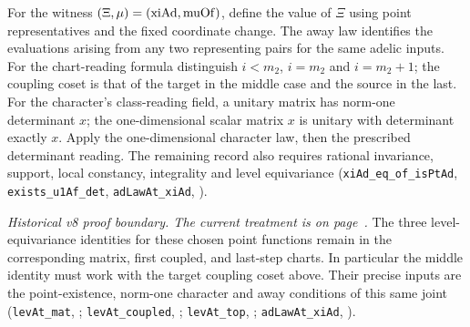 For the witness \((\Xi,\mu)=({\rm xiAd},{\rm muOf})\), define the value of \(\Xi\) using point representatives and the fixed coordinate change. The away law identifies the evaluations arising from any two representing pairs for the same adelic inputs. For the chart-reading formula distinguish \(i<m_2\), \(i=m_2\) and \(i=m_2+1\); the coupling coset is that of the target in the middle case and the source in the last. For the character's class-reading field, a unitary matrix has norm-one determinant \(x\); the one-dimensional scalar matrix \(x\) is unitary with determinant exactly \(x\). Apply the one-dimensional character law, then the prescribed determinant reading. The remaining record also requires rational invariance, support, local constancy, integrality and level equivariance (\nolinkurl{xiAd_eq_of_isPtAd}, \nolinkurl{exists_u1Af_det}, \nolinkurl{adLawAt_xiAd}, ).

\emph{Historical v8 proof boundary. The current treatment is on page~\pageref{r8:Z4.2.02}.} The three level-equivariance identities for these chosen point functions remain in the corresponding matrix, first coupled, and last-step charts. In particular the middle identity must work with the target coupling coset above. Their precise inputs are the point-existence, norm-one character and away conditions of this same joint (\nolinkurl{levAt_mat}, ; \nolinkurl{levAt_coupled}, ; \nolinkurl{levAt_top}, ; \nolinkurl{adLawAt_xiAd}, ).

